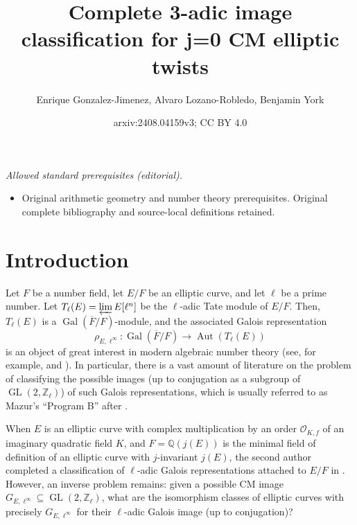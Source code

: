 \documentclass[11pt]{amsart}
\title{Complete 3-adic image classification for j=0 CM elliptic twists}
\author{Enrique Gonzalez-Jimenez, Alvaro Lozano-Robledo, Benjamin York}
\date{arxiv:2408.04159v3; CC BY 4.0}
\theoremstyle{definition}
\newcommand{\Q}{\mathbb Q}
\newcommand{\Z}{\mathbb Z}
\newcommand{\Gal}{\operatorname{Gal}}
\newcommand{\Aut}{\operatorname{Aut}}
\newcommand{\GL}{\operatorname{GL}}
\begin{document}
\maketitle
\noindent\textit{Allowed standard prerequisites (editorial).}\begin{itemize}
\item Original arithmetic geometry and number theory prerequisites. Original complete bibliography and source-local definitions retained.
\end{itemize}\medskip
\section{Introduction}

Let $F$ be a number field, let $E/F$ be an elliptic curve, and let $\ell$ be a prime number. Let $T_\ell(E)=\varprojlim E[\ell^n]$ be the $\ell$-adic Tate module of $E/F$. Then, $T_\ell(E)$ is a $\Gal(\overline{F}/F)$-module, and the associated Galois representation
$$\rho_{E,\ell^{\infty}}\colon \Gal(\overline{F}/F)\to \Aut(T_\ell(E))$$
is an object of great interest in modern algebraic number theory (see, for example, \cite{elladic} and \cite{zywina}). In particular,
there is a vast amount of literature on the problem of classifying the possible images (up to conjugation as a subgroup of $\GL(2,\Z_\ell)$) of such Galois representations, which is usually referred to as Mazur's ``Program B'' after \cite{mazurprogramb}. 

When $E$ is an elliptic curve with complex multiplication by an order $\mathcal{O}_{K,f}$ of an imaginary quadratic field $K$, and $F=\Q(j(E))$ is the minimal field of definition of an elliptic curve with $j$-invariant $j(E)$, the second author completed a classification of $\ell$-adic Galois representations attached to $E/F$ in \cite{lozano-galoiscm}. However, an inverse problem remains: given a possible CM image $G_{E,\ell^\infty}\subseteq \GL(2,\Z_\ell)$, what are the isomorphism classes of elliptic curves with precisely $G_{E,\ell^\infty}$ for their $\ell$-adic Galois image (up to conjugation)?
\end{document}
